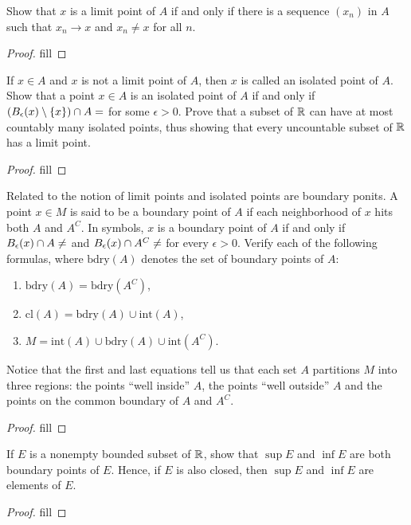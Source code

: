 \begin{exercise}{34}
Show that $x$ is a limit point of $A$ if and only if there is a sequence $(x_n)$ in $A$ such that $x_n\to x$ and $x_n\neq x$ for all $n$.
\end{exercise}
\begin{proof}
fill
\end{proof} 

\begin{exercise}{40}
If $x\in A$ and $x$ is not a limit point of $A$, then $x$ is called an isolated point of $A$. Show that a point $x\in A$ is an isolated point of $A$ if and only if $(B_\epsilon(x)\setminus\set{x})\cap A=\empty$ for some $\epsilon>0$. Prove that a subset of $\mathbb{R}$ can have at most countably many isolated points, thus showing that every uncountable subset of $\mathbb{R}$ has a limit point.
\end{exercise}
\begin{proof}
fill
\end{proof} 

\begin{exercise}{41}
Related to the notion of limit points and isolated points are boundary ponits. A point $x\in M$ is said to be a boundary point of $A$ if each neighborhood of $x$ hits both $A$ and $A^C$. In symbols, $x$ is a boundary point of $A$ if and only if $B_\epsilon(x)\cap A \neq\empty$ and $B_\epsilon(x)\cap A^C \neq\empty$ for every $\epsilon>0$. Verify each of the following formulas, where $\text{bdry}(A)$ denotes the set of boundary points of $A$:
\begin{enumerate}
    \item $\text{bdry}(A)=\text{bdry}(A^C)$,
    \item $\text{cl}(A)=\text{bdry}(A)\cup\text{int}(A)$,
    \item $M=\text{int}(A)\cup\text{bdry}(A)\cup\text{int}(A^C)$.
\end{enumerate}
Notice that the first and last equations tell us that each set $A$ partitions $M$ into three regions: the points ``well inside'' $A$, the points ``well outside'' $A$ and the points on the common boundary of $A$ and $A^C$.
\end{exercise}
\begin{proof}
fill
\end{proof} 

\begin{exercise}{42}
If $E$ is a nonempty bounded subset of $\mathbb{R}$, show that $\sup E$ and $\inf E$ are both boundary points of $E$. Hence, if $E$ is also closed, then $\sup E$ and $\inf E$ are elements of $E$.
\end{exercise}
\begin{proof}
fill
\end{proof} 

